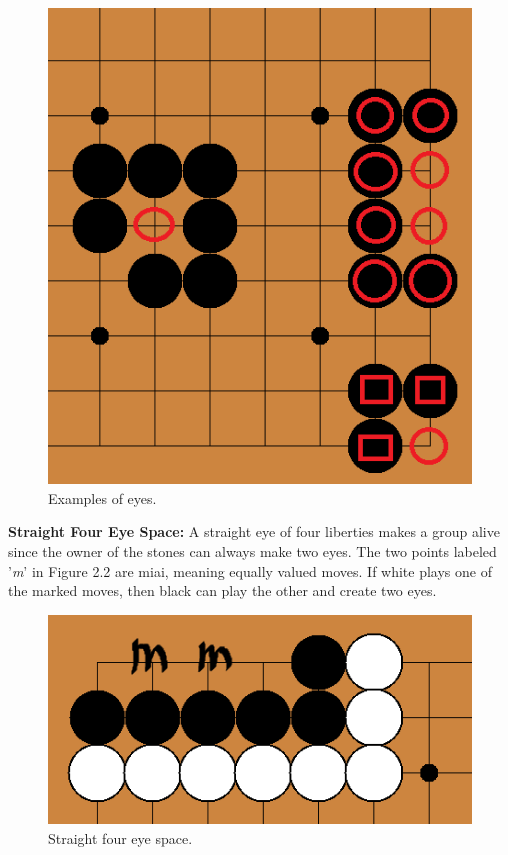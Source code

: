\documentclass{l3proj}
\begin{document}
\begin{figure}[H]
\centering
\includegraphics[scale=0.5]{Images/eyes.png}
\caption{Examples of eyes.}
\end{figure}

\textbf{Straight Four Eye Space:} A straight eye of four liberties makes a group alive since the owner of the stones can always make two eyes. The two points labeled '\textit{m}' in Figure 2.2 are miai, meaning equally valued moves. If white plays one of the marked moves, then black can play the other and create two eyes.

\begin{figure}[H]
\centering
\includegraphics[scale=0.5]{Images/foureyespace.png}
\caption{Straight four eye space.}
\end{figure}
\end{document}
